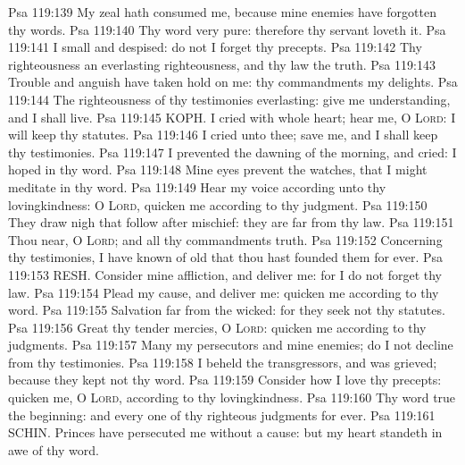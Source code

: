 \vs Psa 119:139 My zeal hath consumed me, because mine enemies have forgotten thy words.
\vs Psa 119:140 Thy word  very pure: therefore thy servant loveth it.
\vs Psa 119:141 I  small and despised:  do not I forget thy precepts.
\vs Psa 119:142 Thy righteousness  an everlasting righteousness, and thy law  the truth.
\vs Psa 119:143 Trouble and anguish have taken hold on me:  thy commandments  my delights.
\vs Psa 119:144 The righteousness of thy testimonies  everlasting: give me understanding, and I shall live.
\vs Psa 119:145 KOPH. I cried with  whole heart; hear me, O \textsc{Lord}: I will keep thy statutes.
\vs Psa 119:146 I cried unto thee; save me, and I shall keep thy testimonies.
\vs Psa 119:147 I prevented the dawning of the morning, and cried: I hoped in thy word.
\vs Psa 119:148 Mine eyes prevent the  watches, that I might meditate in thy word.
\vs Psa 119:149 Hear my voice according unto thy lovingkindness: O \textsc{Lord}, quicken me according to thy judgment.
\vs Psa 119:150 They draw nigh that follow after mischief: they are far from thy law.
\vs Psa 119:151 Thou  near, O \textsc{Lord}; and all thy commandments  truth.
\vs Psa 119:152 Concerning thy testimonies, I have known of old that thou hast founded them for ever.
\vs Psa 119:153 RESH. Consider mine affliction, and deliver me: for I do not forget thy law.
\vs Psa 119:154 Plead my cause, and deliver me: quicken me according to thy word.
\vs Psa 119:155 Salvation  far from the wicked: for they seek not thy statutes.
\vs Psa 119:156 Great  thy tender mercies, O \textsc{Lord}: quicken me according to thy judgments.
\vs Psa 119:157 Many  my persecutors and mine enemies;  do I not decline from thy testimonies.
\vs Psa 119:158 I beheld the transgressors, and was grieved; because they kept not thy word.
\vs Psa 119:159 Consider how I love thy precepts: quicken me, O \textsc{Lord}, according to thy lovingkindness.
\vs Psa 119:160 Thy word  true  the beginning: and every one of thy righteous judgments  for ever.
\vs Psa 119:161 SCHIN. Princes have persecuted me without a cause: but my heart standeth in awe of thy word.
